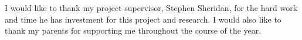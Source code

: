 \def\baselinestretch{1.0}
I would like to thank my project supervisor, Stephen Sheridan, for the hard work and time he has investment for this project and research. I would also like to thank my parents for supporting me throughout the course of the year.

